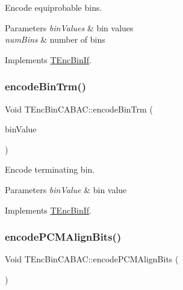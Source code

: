 Encode equiprobable bins. 


\begin{DoxyParams}{Parameters}
{\em bin\+Values} & bin values \\
\hline
{\em num\+Bins} & number of bins \\
\hline
\end{DoxyParams}


Implements \hyperlink{class_t_enc_bin_if}{T\+Enc\+Bin\+If}.

\mbox{\label{class_t_enc_bin_c_a_b_a_c_adcb0c8eb4976f33cbafe2e90004bdbae}} 
\subsubsection{\texorpdfstring{encode\+Bin\+Trm()}{encodeBinTrm()}}
{\footnotesize\ttfamily Void T\+Enc\+Bin\+C\+A\+B\+A\+C\+::encode\+Bin\+Trm (\begin{DoxyParamCaption}\item[{U\+Int}]{bin\+Value }\end{DoxyParamCaption})\hspace{0.3cm}{\ttfamily [virtual]}}



Encode terminating bin. 


\begin{DoxyParams}{Parameters}
{\em bin\+Value} & bin value \\
\hline
\end{DoxyParams}


Implements \hyperlink{class_t_enc_bin_if}{T\+Enc\+Bin\+If}.

\mbox{\label{class_t_enc_bin_c_a_b_a_c_a1efab8efeb60a42f07c6c4515d929911}} 
\subsubsection{\texorpdfstring{encode\+P\+C\+M\+Align\+Bits()}{encodePCMAlignBits()}}
{\footnotesize\ttfamily Void T\+Enc\+Bin\+C\+A\+B\+A\+C\+::encode\+P\+C\+M\+Align\+Bits (\begin{DoxyParamCaption}{ }\end{DoxyParamCaption})\hspace{0.3cm}{\ttfamily [virtual]}}

